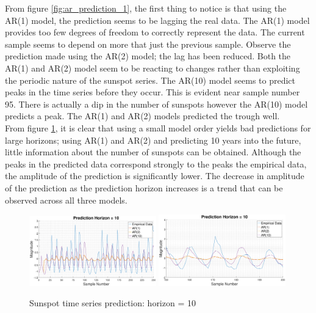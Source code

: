 \documentclass{article}
\begin{document}
From figure \ref{fig:ar_prediction_1}, the first thing to notice is that using the AR(1) model, the prediction seems to be lagging the real data. The AR(1) model provides too few degrees of freedom to correctly represent the data. The current sample seems to depend on more that just the previous sample. Observe the prediction made using the AR(2) model; the lag has been reduced. Both the AR(1) and AR(2) model seem to be reacting to changes rather than exploiting the periodic nature of the sunspot series. The AR(10) model seems to predict peaks in the time series before they occur. This is evident near sample number 95. There is actually a dip in the number of sunspots however the AR(10) model predicts a peak. The AR(1) and AR(2) models predicted the trough well.\\

From figure \ref{fig:ar_prediction_2}, it is clear that using a small model order yields bad predictions for large horizons; using AR(1) and AR(2) and predicting 10 years into the future, little information about the number of sunspots can be obtained. Although the peaks in the predicted data correspond strongly to the peaks the empirical data, the amplitude of the prediction is significantly lower. The decrease in amplitude of the prediction as the prediction horizon increases is a trend that can be observed across all three models.

\begin{figure}[H]
    \centering
    \includegraphics[width = 0.49\textwidth]{sunspot_prediction_horizon_10}
    \includegraphics[width = 0.49\textwidth]{sunspot_prediction_horizon_10_zoom}
    \caption{Sunspot time series prediction: horizon = 10}
    \label{fig:ar_prediction_2}
\end{figure}
\end{document}
